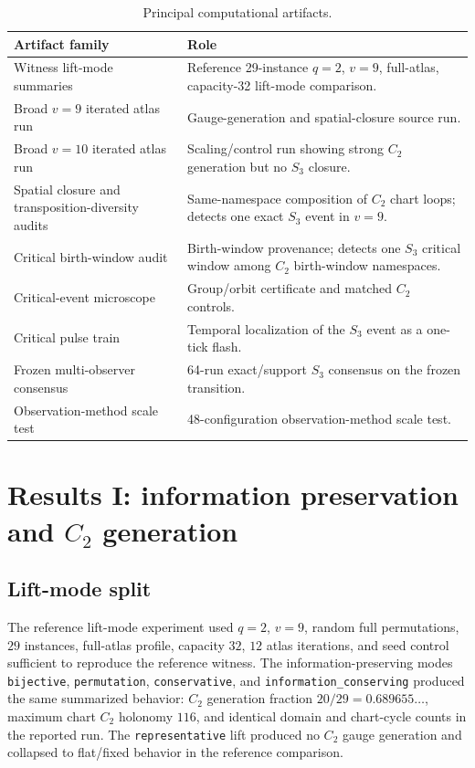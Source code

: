 \documentclass[11pt]{article}
\begin{document}
\begin{table}[p]
\centering
\footnotesize
\caption{Principal computational artifacts.}\label{tab:provenance}
\begin{tabularx}{\textwidth}{>{\raggedright\arraybackslash}p{}X}
\toprule
Artifact family & Role \\
\midrule
Witness lift-mode summaries & Reference 29-instance $q=2$, $v=9$, full-atlas, capacity-32 lift-mode comparison. \\
Broad $v=9$ iterated atlas run & Gauge-generation and spatial-closure source run. \\
Broad $v=10$ iterated atlas run & Scaling/control run showing strong $C_2$ generation but no $S_3$ closure. \\
Spatial closure and transposition-diversity audits & Same-namespace composition of $C_2$ chart loops; detects one exact $S_3$ event in $v=9$. \\
Critical birth-window audit & Birth-window provenance; detects one $S_3$ critical window among $C_2$ birth-window namespaces. \\
Critical-event microscope & Group/orbit certificate and matched $C_2$ controls. \\
Critical pulse train & Temporal localization of the $S_3$ event as a one-tick flash. \\
Frozen multi-observer consensus & 64-run exact/support $S_3$ consensus on the frozen transition. \\
Observation-method scale test & 48-configuration observation-method scale test. \\
\bottomrule
\end{tabularx}
\end{table}

\section{Results I: information preservation and $C_2$ generation}

\subsection{Lift-mode split}

The reference lift-mode experiment used $q=2$, $v=9$, random full permutations, $29$ instances, full-atlas profile, capacity $32$, $12$ atlas iterations, and seed control sufficient to reproduce the reference witness.  The information-preserving modes \texttt{bijective}, \texttt{permutation}, \texttt{conservative}, and \texttt{information\_conserving} produced the same summarized behavior: $C_2$ generation fraction $20/29=0.689655\ldots$, maximum chart $C_2$ holonomy $116$, and identical domain and chart-cycle counts in the reported run.  The \texttt{representative} lift produced no $C_2$ gauge generation and collapsed to flat/fixed behavior in the reference comparison.
\end{document}
